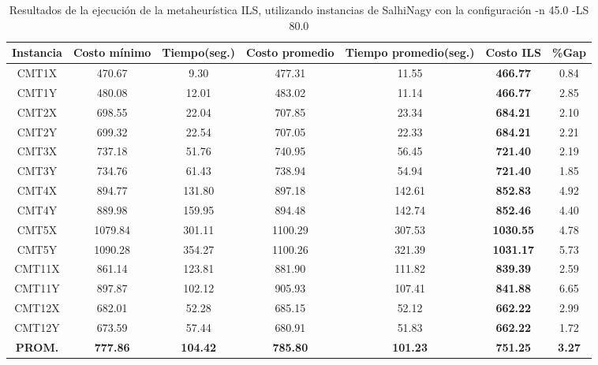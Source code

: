 \begin{table}[ht]
\caption{Resultados de la ejecución de la metaheurística ILS, utilizando instancias de SalhiNagy con la configuración -n 45.0 -LS 80.0}
\centering
\small
\begin{tabular}{c c c c c c c}
\hline\hline
Instancia & Costo mínimo & Tiempo(seg.) & Costo promedio & Tiempo promedio(seg.) & Costo ILS & \%Gap \\ [0.5ex]
\hline
CMT1X & 470.67 & 9.30 & 
477.31 & 11.55 & \bf{466.77} & 
0.84\\CMT1Y & 480.08 & 12.01 & 
483.02 & 11.14 & \bf{466.77} & 
2.85\\CMT2X & 698.55 & 22.04 & 
707.85 & 23.34 & \bf{684.21} & 
2.10\\CMT2Y & 699.32 & 22.54 & 
707.05 & 22.33 & \bf{684.21} & 
2.21\\CMT3X & 737.18 & 51.76 & 
740.95 & 56.45 & \bf{721.40} & 
2.19\\CMT3Y & 734.76 & 61.43 & 
738.94 & 54.94 & \bf{721.40} & 
1.85\\CMT4X & 894.77 & 131.80 & 
897.18 & 142.61 & \bf{852.83} & 
4.92\\CMT4Y & 889.98 & 159.95 & 
894.48 & 142.74 & \bf{852.46} & 
4.40\\CMT5X & 1079.84 & 301.11 & 
1100.29 & 307.53 & \bf{1030.55} & 
4.78\\CMT5Y & 1090.28 & 354.27 & 
1100.26 & 321.39 & \bf{1031.17} & 
5.73\\CMT11X & 861.14 & 123.81 & 
881.90 & 111.82 & \bf{839.39} & 
2.59\\CMT11Y & 897.87 & 102.12 & 
905.93 & 107.41 & \bf{841.88} & 
6.65\\CMT12X & 682.01 & 52.28 & 
685.15 & 52.12 & \bf{662.22} & 
2.99\\CMT12Y & 673.59 & 57.44 & 
680.91 & 51.83 & \bf{662.22} & 
1.72\\\bf{PROM.} & 
\bf{777.86} & \bf{104.42} & \bf{785.80} & \bf{101.23} & \bf{751.25} & \bf{3.27}\\[1ex]\hline
\end{tabular}
\label{table:nonlin}
\end{table} \clearpage
